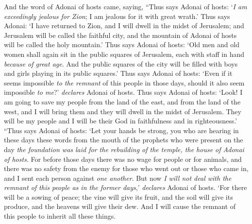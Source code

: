 \begin{biblechapter} %
 And the word of Adonai of hosts came, saying,
\verse “Thus says Adonai of hosts: ‘\textit{I am exceedingly jealous for Zion}; I am jealous for it with great wrath.’
\verse Thus says Adonai: ‘I have returned to Zion, and I will dwell in the midst of Jerusalem; and Jerusalem will be called the faithful city, and the mountain of Adonai of hosts will be called the holy mountain.’
\verse Thus says Adonai of hosts: ‘Old men and old women shall again sit in the public squares of Jerusalem, each with staff in hand \textit{because of great age}.
\verse And the public squares of the city will be filled with boys and girls playing in its public squares.’
\verse Thus says Adonai of hosts: ‘Even if it seems impossible \textit{to the remnant} of this people in those days, should it also seem impossible \textit{to me}?’ \textit{declares} Adonai of hosts.
\verse Thus says Adonai of hosts: ‘Look! I am going to save my people from the land of the east, and from the land of the west,
\verse and I will bring them and they will dwell in the midst of Jerusalem. They will be my people and I will be their God in faithfulness and in righteousness.’
\verse “Thus says Adonai of hosts: ‘Let your hands be strong, you who are hearing in these days these words from the mouth of the prophets who were present on the day \textit{the foundation was laid for the rebuilding of the temple, the house of Adonai of hosts}.
\verse For before those days there was no wage for people or for animals, and there was no safety from the enemy for those who went out or those who came in, and I sent each person against \textit{one another}.
\verse But now \textit{I will not deal with the remnant of this people as in the former days},’ \textit{declares} Adonai of hosts.
\verse ‘For there will be a sowing of peace; the vine will give its fruit, and the soil will give its produce, and the heavens will give their dew. And I will cause the remnant of this people to inherit all these things.

\end{biblechapter}
